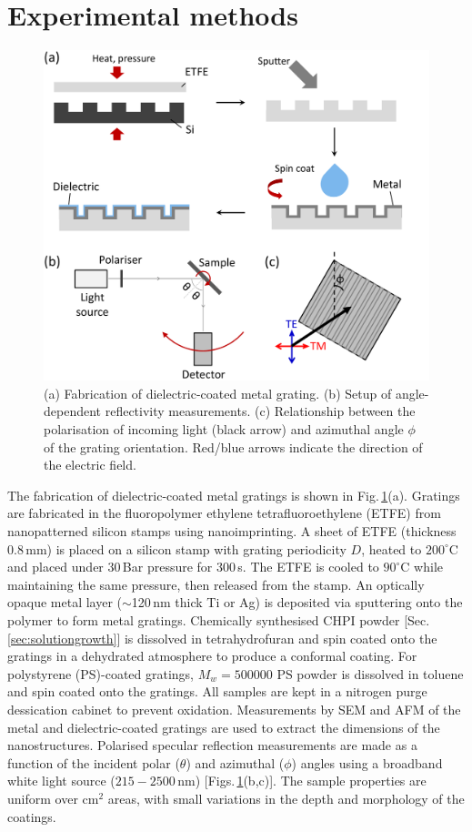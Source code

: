 \section{Experimental methods}
\begin{figure}[h!] 
\centering    
\includegraphics[width=\textwidth]{Fig1}
\caption[(a) Fabrication and (b,c) setup of optical measurements on dielectric-coated metal gratings.]{(a) Fabrication of dielectric-coated metal grating. (b) Setup of angle-dependent reflectivity measurements. (c) Relationship between the polarisation of incoming light (black arrow) and azimuthal angle $\phi$ of the grating orientation. Red/blue arrows indicate the direction of the electric field.}
\label{7Fig1}
\end{figure}
The fabrication of dielectric-coated metal gratings is shown in Fig.\,\ref{7Fig1}(a). Gratings are fabricated in the fluoropolymer ethylene tetrafluoroethylene (ETFE) from nanopatterned silicon stamps using nanoimprinting. A sheet of ETFE (thickness 0.8\,mm) is placed on a silicon stamp with grating periodicity $D$, heated to $200^{\circ}$C and placed under 30\,Bar pressure for 300\,s. The ETFE is cooled to $90^{\circ}$C while maintaining the same pressure, then released from the stamp. An optically opaque metal layer ($\sim$120\,nm thick Ti or Ag) is deposited via sputtering onto the polymer to form metal gratings. Chemically synthesised CHPI powder [Sec.\,\ref{sec:solutiongrowth}] is dissolved in tetrahydrofuran and spin coated onto the gratings in a dehydrated atmosphere to produce a conformal coating. For polystyrene (PS)-coated gratings, $M_w=500000$ PS powder is dissolved in toluene and spin coated onto the gratings. All samples are kept in a nitrogen purge dessication cabinet to prevent oxidation. Measurements by SEM and AFM of the metal and dielectric-coated gratings are used to extract the dimensions of the nanostructures. Polarised specular reflection measurements are made as a function of the incident polar ($\theta$) and azimuthal ($\phi$) angles using a broadband white light source ($215-2500$\,nm) [Figs.\,\ref{7Fig1}(b,c)]. The sample properties are uniform over cm$^2$ areas, with small variations in the depth and morphology of the coatings.

